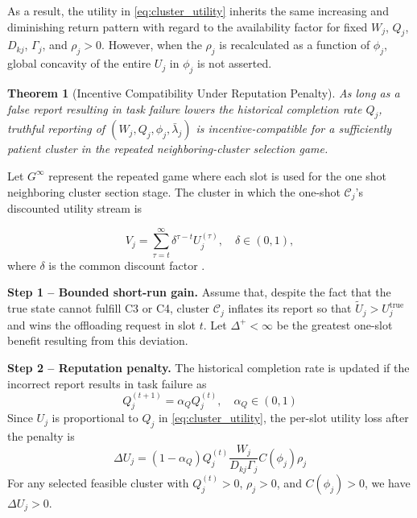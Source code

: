\documentclass[journal]{IEEEtran}
\newtheorem{theorem}{Theorem}
\begin{document}
\begin{IEEEproof}
As a result, the utility in \eqref{eq:cluster_utility} inherits the same increasing and diminishing return pattern with regard to the availability factor for fixed
$W_{j}$, $Q_{j}$, $D_{kj}$, $\Gamma_{j}$, and
$\rho_{j}>0$. However, when the $\rho_{j}$ is recalculated as a function of $\phi_{j}$, global concavity of the entire $U_{j}$ in $\phi_{j}$ is not asserted.
\begin{theorem}[Incentive Compatibility Under Reputation Penalty]
\label{thm:truthful}
As long as a false report resulting in task failure lowers the historical completion rate $Q_{j}$, truthful reporting of $(W_{j},Q_{j},\phi_{j},\bar{\lambda}_{j})$ is incentive-compatible for a sufficiently patient cluster in the repeated neighboring-cluster selection game.
\end{theorem}

\begin{IEEEproof}
Let $G^{\infty}$ represent the repeated game where each slot is used for the one shot neighboring cluster section stage. The cluster in which the one-shot $\mathcal{C}_{j}$'s discounted utility stream is

\begin{equation}
  V_{j}=\sum_{\tau=t}^{\infty}\delta^{\tau-t}U_{j}^{(\tau)},
  \quad \delta\in(0,1),
  \label{eq:discounted_value}
\end{equation}
where $\delta$ is the common discount factor \cite{ref17,ref18}.

\smallskip
\noindent\textbf{Step 1 -- Bounded short-run gain.}
Assume that, despite the fact that the true state cannot fulfill C3 or C4, cluster $\mathcal{C}_{j}$ inflates its report so that $\tilde{U}_{j}>U_{j}^{\mathrm{true}}$ and wins the offloading request in slot $t$. Let $\Delta^{+}<\infty$ be the greatest one-slot benefit resulting from this deviation.

\smallskip
\noindent\textbf{Step 2 -- Reputation penalty.}
The historical completion rate is updated if the incorrect report results in task failure as
\begin{equation}
  Q_{j}^{(t+1)}=\alpha_{Q}Q_{j}^{(t)},
  \quad \alpha_{Q}\in(0,1)
  \label{eq:Q_update}
\end{equation}
Since $U_{j}$ is proportional to $Q_{j}$ in \eqref{eq:cluster_utility}, the
per-slot utility loss after the penalty is
\begin{equation}
  \Delta U_{j}=(1-\alpha_{Q})Q_{j}^{(t)}
  \frac{W_{j}}{D_{kj}\Gamma_{j}}
  C(\phi_{j})\rho_{j}
  \label{eq:delta_U}
\end{equation}
For any selected feasible cluster with $Q_{j}^{(t)}>0$, $\rho_{j}>0$, and
$C(\phi_{j})>0$, we have $\Delta U_{j}>0$.


\end{IEEEproof}
\end{IEEEproof}
\end{document}
